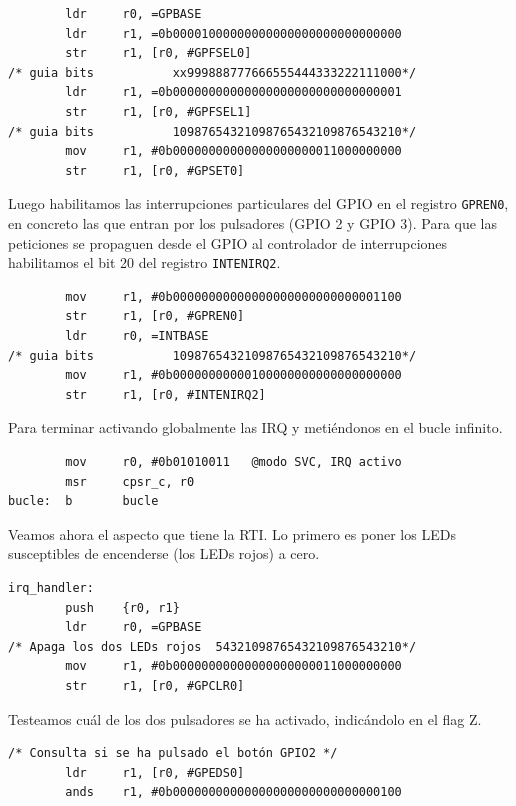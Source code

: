 \begin{lstlisting}
        ldr     r0, =GPBASE
        ldr     r1, =0b00001000000000000000000000000000
        str     r1, [r0, #GPFSEL0]
/* guia bits           xx999888777666555444333222111000*/
        ldr     r1, =0b00000000000000000000000000000001
        str     r1, [r0, #GPFSEL1]
/* guia bits           10987654321098765432109876543210*/
        mov     r1, #0b00000000000000000000011000000000
        str     r1, [r0, #GPSET0]
\end{lstlisting}

Luego habilitamos las interrupciones particulares del GPIO en el registro
{\tt GPREN0}, en concreto las que entran por los pulsadores (GPIO 2 y GPIO 3). 
Para que las peticiones se propaguen desde el GPIO al controlador de interrupciones
habilitamos el bit 20 del registro {\tt INTENIRQ2}.

\begin{lstlisting}
        mov     r1, #0b00000000000000000000000000001100
        str     r1, [r0, #GPREN0]
        ldr     r0, =INTBASE
/* guia bits           10987654321098765432109876543210*/
        mov     r1, #0b00000000000100000000000000000000
        str     r1, [r0, #INTENIRQ2]
\end{lstlisting}

Para terminar activando globalmente las IRQ y metiéndonos en el bucle infinito.

\begin{lstlisting}
        mov     r0, #0b01010011   @modo SVC, IRQ activo
        msr     cpsr_c, r0
bucle:  b       bucle
\end{lstlisting}

Veamos ahora el aspecto que tiene la RTI. Lo primero es poner los LEDs susceptibles de
encenderse (los LEDs rojos) a cero.

\begin{lstlisting}
irq_handler:
        push    {r0, r1}
        ldr     r0, =GPBASE
/* Apaga los dos LEDs rojos  54321098765432109876543210*/
        mov     r1, #0b00000000000000000000011000000000
        str     r1, [r0, #GPCLR0]
\end{lstlisting}

Testeamos cuál de los dos pulsadores se ha activado, indicándolo en el flag Z.

\begin{lstlisting}
/* Consulta si se ha pulsado el botón GPIO2 */
        ldr     r1, [r0, #GPEDS0]
        ands    r1, #0b00000000000000000000000000000100
\end{lstlisting}

